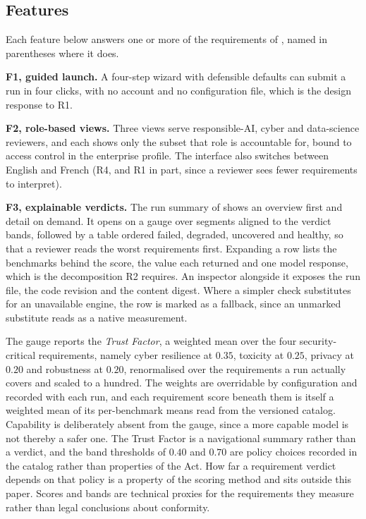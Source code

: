 \documentclass[10pt,conference,a4paper]{IEEEtran}
\begin{document}
\subsection{Features}
Each feature below answers one or more of the requirements of , named in parentheses where it does.

\textbf{F1, guided launch.}
A four-step wizard with defensible defaults can submit a run in four clicks, with no account and no configuration file, which is the design response to R1.

\textbf{F2, role-based views.}
Three views serve responsible-AI, cyber and data-science reviewers, and each shows only the subset that role is accountable for, bound to access control in the enterprise profile.
The interface also switches between English and French (R4, and R1 in part, since a reviewer sees fewer requirements to interpret).

\textbf{F3, explainable verdicts.}
The run summary of  shows an overview first and detail on demand.
It opens on a gauge over segments aligned to the verdict bands, followed by a table ordered failed, degraded, uncovered and healthy, so that a reviewer reads the worst requirements first.
Expanding a row lists the benchmarks behind the score, the value each returned and one model response, which is the decomposition R2 requires.
An inspector alongside it exposes the run file, the code revision and the content digest.
Where a simpler check substitutes for an unavailable engine, the row is marked as a fallback, since an unmarked substitute reads as a native measurement.

The gauge reports the \emph{Trust Factor}, a weighted mean over the four security-critical requirements, namely cyber resilience at $0.35$, toxicity at $0.25$, privacy at $0.20$ and robustness at $0.20$, renormalised over the requirements a run actually covers and scaled to a hundred.
The weights are overridable by configuration and recorded with each run, and each requirement score beneath them is itself a weighted mean of its per-benchmark means read from the versioned catalog.
Capability is deliberately absent from the gauge, since a more capable model is not thereby a safer one.
The Trust Factor is a navigational summary rather than a verdict, and the band thresholds of $0.40$ and $0.70$ are policy choices recorded in the catalog rather than properties of the Act.
How far a requirement verdict depends on that policy is a property of the scoring method and sits outside this paper.
Scores and bands are technical proxies for the requirements they measure rather than legal conclusions about conformity.
\end{document}
